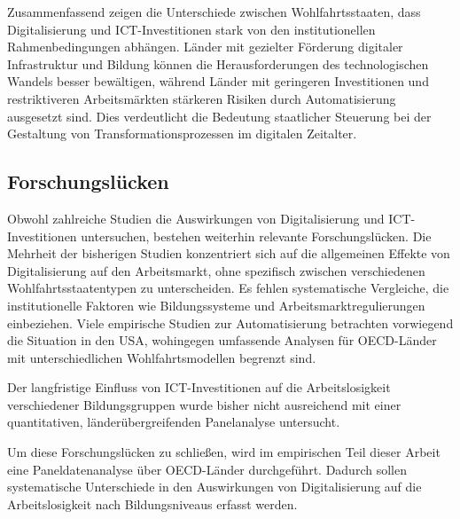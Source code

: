 Zusammenfassend zeigen die Unterschiede zwischen Wohlfahrtsstaaten, dass Digitalisierung und 
\ac{ICT}-Investitionen stark von den institutionellen Rahmenbedingungen abhängen. Länder mit 
gezielter Förderung digitaler Infrastruktur und Bildung können die Herausforderungen des 
technologischen Wandels besser bewältigen, während Länder mit geringeren Investitionen und 
restriktiveren Arbeitsmärkten stärkeren Risiken durch Automatisierung ausgesetzt sind. Dies 
verdeutlicht die Bedeutung staatlicher Steuerung bei der Gestaltung von Transformationsprozessen 
im digitalen Zeitalter.


\subsection{Forschungslücken}

Obwohl zahlreiche Studien die Auswirkungen von Digitalisierung und \ac{ICT}-Investitionen 
untersuchen, bestehen weiterhin relevante Forschungslücken. Die Mehrheit der bisherigen 
Studien konzentriert sich auf die allgemeinen Effekte von Digitalisierung auf den 
Arbeitsmarkt, ohne spezifisch zwischen verschiedenen Wohlfahrtsstaatentypen zu 
unterscheiden. Es fehlen systematische Vergleiche, die institutionelle Faktoren wie 
Bildungssysteme und Arbeitsmarktregulierungen einbeziehen. Viele empirische Studien zur 
Automatisierung betrachten vorwiegend die Situation in den USA, wohingegen umfassende 
Analysen für \ac{OECD}-Länder mit unterschiedlichen Wohlfahrtsmodellen begrenzt sind.

Der langfristige Einfluss von \ac{ICT}-Investitionen auf die Arbeitslosigkeit 
verschiedener Bildungsgruppen wurde bisher nicht ausreichend mit einer quantitativen, 
länderübergreifenden Panelanalyse untersucht.

Um diese Forschungslücken zu schließen, wird im empirischen Teil dieser Arbeit eine 
Paneldatenanalyse über \ac{OECD}-Länder durchgeführt. Dadurch sollen systematische 
Unterschiede in den Auswirkungen von Digitalisierung auf die Arbeitslosigkeit nach 
Bildungsniveaus erfasst werden.
